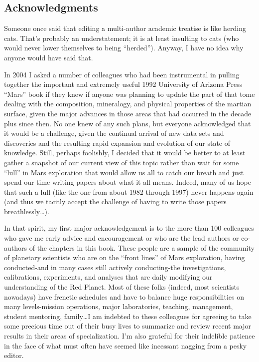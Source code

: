 \begin{acknowledgment}
\chapter*{Acknowledgments}

Someone once said that editing a multi-author academic treatise is like herding cats. That's probably an understatement; it is at least insulting to cats (who would never lower themselves to being ``herded''). Anyway, I have no idea why anyone would have said that.

In 2004 I asked a number of colleagues who had been instrumental in pulling together the important and extremely useful 1992 University of Arizona Press ``Mars'' book if they knew if anyone was planning to update the part of that tome dealing with the composition, mineralogy, and physical properties of the martian surface, given the major advances in those areas that had occurred in the decade plus since then. No one knew of any such plans, but everyone acknowledged that it would be a challenge, given the continual arrival of new data sets and discoveries and the resulting rapid expansion and evolution of our state of knowledge. Still, perhaps foolishly, I decided that it would be better to at least gather a snapshot of our current view of this topic rather than wait for some ``lull'' in Mars exploration that would allow us all to catch our breath and just spend our time writing papers about what it all means. Indeed, many of us hope that such a lull (like the one from about 1982 through 1997) never happens again (and thus we tacitly accept the challenge of having to write those papers breathlessly\ldots).

In that spirit, my first major acknowledgement is to the more than 100 colleagues who gave me early advice and encouragement or who are the lead authors or co-authors of the chapters in this book. These people are a sample of the community of planetary scientists who are on the ``front lines'' of Mars exploration, having conducted-and in many cases still actively conducting-the investigations, calibrations, experiments, and analyses that are daily modifying our understanding of the Red Planet. Most of these folks (indeed, most scientists nowadays) have frenetic schedules and have to balance huge responsibilities on many levels-mission operations, major laboratories, teaching, management, student mentoring, family\ldots I am indebted to these colleagues for agreeing to take some precious time out of their busy lives to summarize and review recent major results in their areas of specialization. I'm also grateful for their indelible patience in the face of what must often have seemed like incessant nagging from a pesky editor.


\end{acknowledgment}
